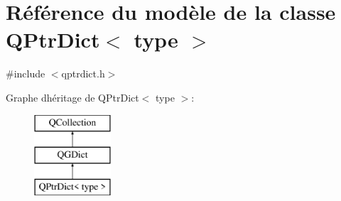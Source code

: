 \hypertarget{class_q_ptr_dict}{}\section{Référence du modèle de la classe Q\+Ptr\+Dict$<$ type $>$}
\label{class_q_ptr_dict}


{\ttfamily \#include $<$qptrdict.\+h$>$}

Graphe d\textquotesingle{}héritage de Q\+Ptr\+Dict$<$ type $>$\+:\begin{figure}[H]
\begin{center}
\leavevmode
\includegraphics[height=3.000000cm]{class_q_ptr_dict}
\end{center}
\end{figure}
